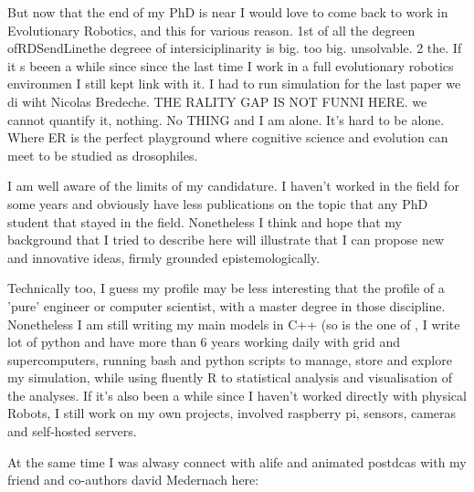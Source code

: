 \documentclass[10pt]{article}
\begin{document}
But now that the end of my PhD is near I would love to come back to work in Evolutionary Robotics, and this for various reason.  1st of all the degreen ofRDSendLinethe degreee of intersiciplinarity is big. too big. unsolvable. 2 the. If it s beeen a while since since the last time I work in a full evolutionary robotics environmen I still kept link with it. I had to run simulation for the last paper we di wiht Nicolas Bredeche.  THE RALITY GAP IS NOT FUNNI HERE. we cannot quantify it, nothing. No THING and I am alone. It's hard to be alone. Where ER is the perfect playground where cognitive science and evolution can meet to be studied as drosophiles.

I am well aware of the limits of my candidature. I haven't worked in the field for some years and obviously have less publications on the topic that any PhD student that stayed in the field. Nonetheless I think and hope that my background that I tried to describe here will illustrate that I can propose new and innovative ideas, firmly grounded epistemologically. 

Technically too, I guess my profile may be less interesting that the profile of a 'pure' engineer or computer scientist, with a master degree in those discipline.  Nonetheless I am still writing my main models in C++ (so is the one of \cite{carrignon2015modelingthecoevolutionoftradeandcultureinpastsocieties}, I write lot of python and have more than 6 years working daily with grid and supercomputers, running bash and python scripts to manage, store and  explore my simulation, while using fluently R to statistical analysis and visualisation of the analyses. If it's also been a while since I haven't worked directly with physical Robots, I still work on my own projects, involved raspberry pi, sensors, cameras and self-hosted servers.

At the same time I was alwasy connect with alife and animated postdcas with my friend and co-authors david Medernach here: 


%
%
\end{document}
